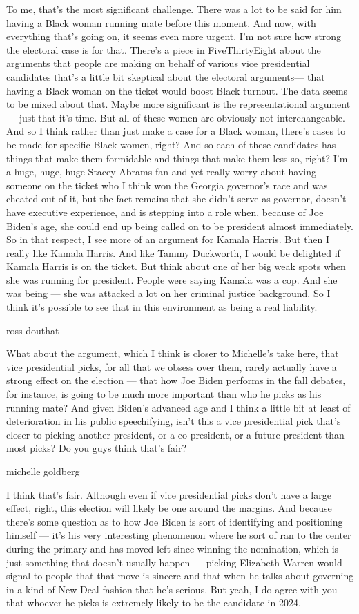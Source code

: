 To me, that's the most significant challenge. There was a lot to be said
for him having a Black woman running mate before this moment. And now,
with everything that's going on, it seems even more urgent. I'm not sure
how strong the electoral case is for that. There's a piece in
FiveThirtyEight about the arguments that people are making on behalf of
various vice presidential candidates that's a little bit skeptical about
the electoral arguments--- that having a Black woman on the ticket would
boost Black turnout. The data seems to be mixed about that. Maybe more
significant is the representational argument--- just that it's time. But
all of these women are obviously not interchangeable. And so I think
rather than just make a case for a Black woman, there's cases to be made
for specific Black women, right? And so each of these candidates has
things that make them formidable and things that make them less so,
right? I'm a huge, huge, huge Stacey Abrams fan and yet really worry
about having someone on the ticket who I think won the Georgia
governor's race and was cheated out of it, but the fact remains that she
didn't serve as governor, doesn't have executive experience, and is
stepping into a role when, because of Joe Biden's age, she could end up
being called on to be president almost immediately. So in that respect,
I see more of an argument for Kamala Harris. But then I really like
Kamala Harris. And like Tammy Duckworth, I would be delighted if Kamala
Harris is on the ticket. But think about one of her big weak spots when
she was running for president. People were saying Kamala was a cop. And
she was being --- she was attacked a lot on her criminal justice
background. So I think it's possible to see that in this environment as
being a real liability.

ross douthat

What about the argument, which I think is closer to Michelle's take
here, that vice presidential picks, for all that we obsess over them,
rarely actually have a strong effect on the election --- that how Joe
Biden performs in the fall debates, for instance, is going to be much
more important than who he picks as his running mate? And given Biden's
advanced age and I think a little bit at least of deterioration in his
public speechifying, isn't this a vice presidential pick that's closer
to picking another president, or a co-president, or a future president
than most picks? Do you guys think that's fair?

michelle goldberg

I think that's fair. Although even if vice presidential picks don't have
a large effect, right, this election will likely be one around the
margins. And because there's some question as to how Joe Biden is sort
of identifying and positioning himself --- it's his very interesting
phenomenon where he sort of ran to the center during the primary and has
moved left since winning the nomination, which is just something that
doesn't usually happen --- picking Elizabeth Warren would signal to
people that that move is sincere and that when he talks about governing
in a kind of New Deal fashion that he's serious. But yeah, I do agree
with you that whoever he picks is extremely likely to be the candidate
in 2024.

